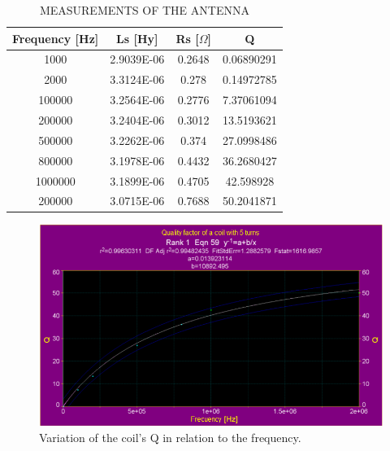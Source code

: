 \documentclass{article} %
\begin{document}
\begin{multicols}{2}
\begin{table}[H]
\centering
\caption{MEASUREMENTS OF THE ANTENNA}
\label{table:med_antena}
\begin{tabular}{c|c|c|c}
\textbf{Frequency  [Hz]} & \textbf{Ls [Hy]}       & \textbf{Rs [$\Omega$]} & \textbf{Q}                                                                                \\ \hline
1000                    & 2.9039E-06 & 0.2648   & 0.06890291                                                                             \\
2000                 & 3.3124E-06 & 0.278   & 0.14972785                                                                             \\
100000                  & 3.2564E-06 & 0.2776   & 7.37061094                                                                                 \\
200000                  & 3.2404E-06 & 0.3012   & 13.5193621                                                                             \\
500000                  & 3.2262E-06 & 0.374   & 27.0998486                                                                             \\
800000                  & 3.1978E-06 & 0.4432   & 36.2680427                                                                             \\
1000000                  & 3.1899E-06 & 0.4705   & 42.598928                                                                             \\
200000                  & 3.0715E-06 & 0.7688   & 50.2041871          
\end{tabular}
\end{table}

\begin{figure}[H]
\centering
\includegraphics[scale=0.4]{Images/ImagenesTesina/antena/Simulacion_Q_Antena_2.png}
\caption{Variation of the coil's Q in relation to the frequency.}
\label{fig:L_Qsim}
\end{figure}


\end{multicols}
\end{document}
